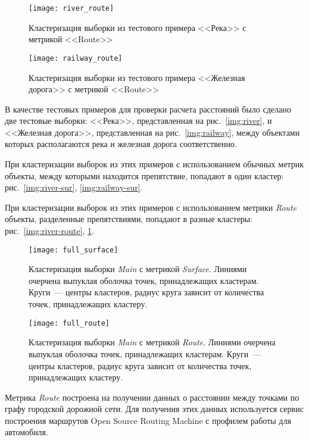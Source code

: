 \begin{figure}[b!]
    \centering
    \texttt{[image: river\_route]}\\[1ex]
    \parbox{.9\textwidth}{\caption{Кластеризация выборки из тестового примера <<Река>> с метрикой <<Route>>} \label{img:river-route}}
    \texttt{[image: railway\_route]}\\[1ex]
    \parbox{.9\textwidth}{\caption{Кластеризация выборки из тестового примера <<Железная дорога>> с метрикой <<Route>>} \label{img:railway-route}}
\end{figure}

В качестве тестовых примеров для проверки расчета расстояний было сделано две тестовые выборки: <<Река>>, представленная на рис.~\ref{img:river}, и <<Железная дорога>>, представленная на рис.~\ref{img:railway}, между объектами которых располагаются река и железная дорога соответственно.

При кластеризации выборок из этих примеров с использованием обычных метрик объекты, между которыми находится препятствие, попадают в один кластер: рис.~\ref{img:river-sur}, \ref{img:railway-sur}.

При кластеризации выборок из этих примеров с использованием метрики \emph{Route} объекты, разделенные препятствиями, попадают в разные кластеры: рис.~\ref{img:river-route}, \ref{img:railway-route}.
\begin{figure}[b!]
    \centering
    \texttt{[image: full\_surface]}\\[1ex]
    \parbox{.9\textwidth}{\caption{Кластеризация выборки \emph{Main} с метрикой \emph{Surface}. Линиями очерчена выпуклая оболочка точек, принадлежащих кластерам. Круги~--- центры кластеров, радиус круга зависит от количества точек, принадлежащих кластеру.} \label{img:full-surface}}
    \texttt{[image: full\_route]}\\[1ex]
    \parbox{.9\textwidth}{\caption{Кластеризация выборки \emph{Main} с метрикой \emph{Route}. Линиями очерчена выпуклая оболочка точек, принадлежащих кластерам. Круги~--- центры кластеров, радиус круга зависит от количества точек, принадлежащих кластеру.} \label{img:full-route}}
\end{figure}

Метрика \emph{Route} построена на получении данных о расстоянии между точками по графу городской дорожной сети. Для получения этих данных используется сервис построения маршрутов Open Source Routing Machine с профилем работы для автомобиля.

